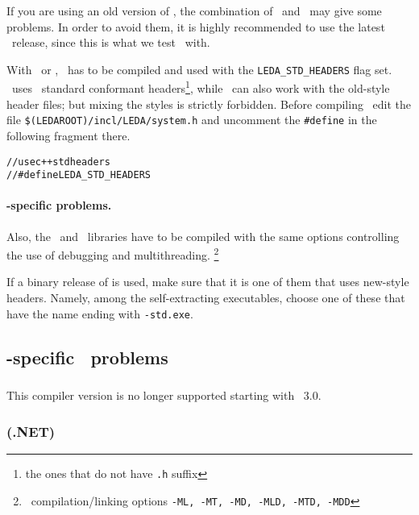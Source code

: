 If you are using an old version of \leda, the combination of \leda\ 
and \stl\ may give some problems. In order to avoid them, it is highly
recommended to use the latest \leda\ release, since this is what we
test \cgal\ with.

With \msvc\ or \bcc, \leda\ has to be compiled and used with the
\texttt{LEDA\_STD\_HEADERS} flag set. \cgal\ uses \CC\ standard
conformant headers\footnote{the ones that do not have \texttt{.h}
  suffix}, while \leda\ can also work with the old-style header files;
but mixing the styles is strictly forbidden. Before compiling \leda\,
edit the file \texttt{\$(LEDAROOT)/incl/LEDA/system.h} and uncomment
the \texttt{\#define} in the following fragment there.
\begin{alltt}
// use c++ std headers
//#define LEDA_STD_HEADERS
\end{alltt}

\paragraph{\msvc-specific problems.}

Also, the \leda\ and \cgal\ libraries have to be compiled with the
same options controlling the use of debugging and multithreading.
\footnote{\msvc\ compilation/linking options \texttt{-ML, -MT, -MD,
    -MLD, -MTD, -MDD}}

If a binary release of \leda{} is used, make sure that it is one of
them that uses new-style headers. Namely, among the self-extracting
executables, choose one of these that have the name ending with
\texttt{-std.exe}.

\subsection{\msvc{}-specific \CC\ problems}

\subsubsection{}

This compiler version is no longer supported starting with \cgal\ 3.0.

\subsubsection{ (\textsc{.NET})}

